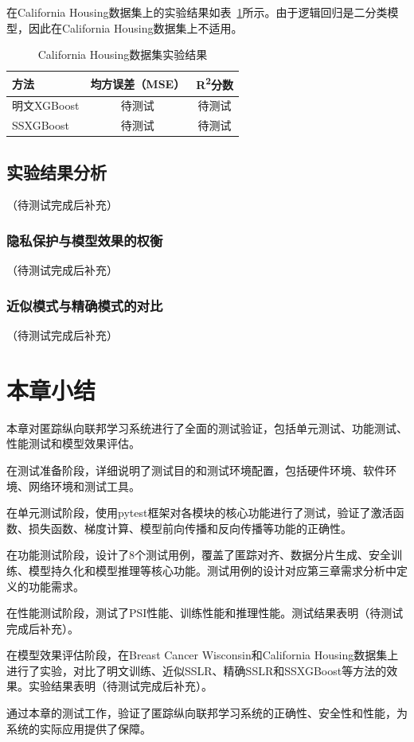 在California Housing数据集上的实验结果如表~\ref{tab:exp-housing}所示。由于逻辑回归是二分类模型，因此在California Housing数据集上不适用。
\begin{table}[htbp]
    \centering
    \caption{California Housing数据集实验结果}
    \label{tab:exp-housing}
    \begin{tabular}{lcc}
        \toprule
        \textbf{方法} & \textbf{均方误差（MSE）} & \textbf{R\textsuperscript{2}分数} \\
        \midrule
        明文XGBoost & 待测试 & 待测试 \\
        SSXGBoost & 待测试 & 待测试 \\
        \bottomrule
    \end{tabular}
\end{table}

\subsection{实验结果分析}

（待测试完成后补充）

\subsubsection{隐私保护与模型效果的权衡}

（待测试完成后补充）

\subsubsection{近似模式与精确模式的对比}

（待测试完成后补充）

\section{本章小结}
\label{sec:test-summary}

本章对匿踪纵向联邦学习系统进行了全面的测试验证，包括单元测试、功能测试、性能测试和模型效果评估。

在测试准备阶段，详细说明了测试目的和测试环境配置，包括硬件环境、软件环境、网络环境和测试工具。

在单元测试阶段，使用pytest框架对各模块的核心功能进行了测试，验证了激活函数、损失函数、梯度计算、模型前向传播和反向传播等功能的正确性。

在功能测试阶段，设计了8个测试用例，覆盖了匿踪对齐、数据分片生成、安全训练、模型持久化和模型推理等核心功能。测试用例的设计对应第三章需求分析中定义的功能需求。

在性能测试阶段，测试了PSI性能、训练性能和推理性能。测试结果表明（待测试完成后补充）。

在模型效果评估阶段，在Breast Cancer Wisconsin和California Housing数据集上进行了实验，对比了明文训练、近似SSLR、精确SSLR和SSXGBoost等方法的效果。实验结果表明（待测试完成后补充）。

通过本章的测试工作，验证了匿踪纵向联邦学习系统的正确性、安全性和性能，为系统的实际应用提供了保障。